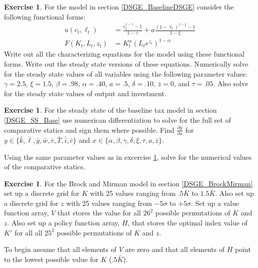 \documentclass[letterpaper,12pt]{article}
\theoremstyle{definition}
\newtheorem{exercise}[theorem]{Exercise}
\begin{document}
\begin{spacing}{1.5}
	\begin{exercise} \label{DSGE_HW_CES}
		For the model in section \ref{DSGE_BaselineDSGE} consider the following functional forms:
		\begin{equation}\label{DSGE_HW_CES_eq01}
		\begin{split}
		u(c_t,\ell_t) & = \frac{c^{1-\gamma}_t -1}{1-\gamma}+ a \frac{(1-\ell_t)^{1-\xi}-1}{1-\xi}      \\
		F(K_t,L_t,z_t) & = K^{\alpha}_t (L_te^{z_t})^{1-\alpha}  \nonumber
		\end{split}
		\end{equation}
		Write out all the characterizing equations for the model using these functional forms.  {}Write out the steady state versions of these equations.  Numerically solve for the steady state values of all variables using the following parameter values: $\gamma = 2.5$, $\xi = 1.5$,  $\beta = .98$, $\alpha = .40$, $a=.5$, $\delta = .10$, $\bar z = 0$, and $\tau = .05$.  Also solve for the steady state values of output and investment.
	\end{exercise}

	\begin{exercise} \label{DSGE_HW_Base_TotalDiff}
		For the steady state of the baseline tax model in section \ref{DSGE_SS_Base} use numerican differentiation to solve for the full set of comparative statics and sign them where possible.  Find $\frac{\partial y}{\partial x}$ for $y\in\{\bar k, \bar \ell, \bar y, \bar w, \bar r, \bar T, \bar i, \bar c \}$ and $x\in\{\alpha, \beta, \gamma, \delta, \xi, \tau, a, \bar z\}$.

		Using the same parameter values as in excercise \ref{DSGE_HW_CES}, solve for the numerical values of the comparative statics.
	\end{exercise}

	\begin{exercise} \label{DSGE_HW_BM_Grid}
		For the Brock and Mirman model in section \eqref{DSGE_BrockMirman} set up a discrete grid for $K$ with 25 values ranging from $.5 \bar K$ to $1.5 \bar K$.  Also set up a discrete grid for $z$ with 25 values ranging from $-5\sigma$ to $+5\sigma$.  Set up a value function array, $V$ that stores the value for all $26^2$ possible permutations of $K$ and $z$.  Also set up a policy function array, $H$, that stores the optimal index value of $K'$ for all all $25^2$ possible permutations of $K$ and $z$.

		To begin assume that all elements of $V$ are zero and that all elements of $H$ point to the lowest possible value for $K$ ($.5 \bar K$).


\end{exercise}
\end{spacing}
\end{document}
